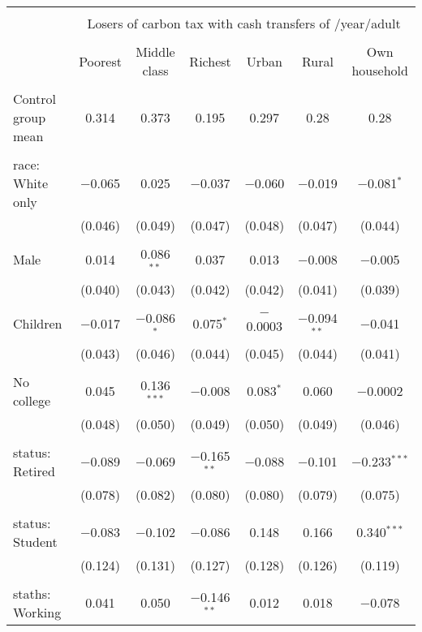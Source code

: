
\begin{tabular}{@{\extracolsep{5pt}}lcccccc} 
\\[-1.8ex]\hline 
\hline \\[-1.8ex] 
 & \multicolumn{6}{c}{Losers of carbon tax with cash transfers of \textdollar 600/year/adult} \\ 
\cline{2-7} 
\\[-1.8ex] & Poorest & Middle class & Richest & Urban & Rural & Own household \\ 
\hline \\[-1.8ex] 
 Control group mean & 0.314 & 0.373 & 0.195 & 0.297 & 0.28 & 0.28  \\ \hline \\[-1.8ex] race: White only & $-$0.065 & 0.025 & $-$0.037 & $-$0.060 & $-$0.019 & $-$0.081$^{*}$ \\ 
  & (0.046) & (0.049) & (0.047) & (0.048) & (0.047) & (0.044) \\ 
  & & & & & & \\ 
 Male & 0.014 & 0.086$^{**}$ & 0.037 & 0.013 & $-$0.008 & $-$0.005 \\ 
  & (0.040) & (0.043) & (0.042) & (0.042) & (0.041) & (0.039) \\ 
  & & & & & & \\ 
 Children & $-$0.017 & $-$0.086$^{*}$ & 0.075$^{*}$ & $-$0.0003 & $-$0.094$^{**}$ & $-$0.041 \\ 
  & (0.043) & (0.046) & (0.044) & (0.045) & (0.044) & (0.041) \\ 
  & & & & & & \\ 
 No college & 0.045 & 0.136$^{***}$ & $-$0.008 & 0.083$^{*}$ & 0.060 & $-$0.0002 \\ 
  & (0.048) & (0.050) & (0.049) & (0.050) & (0.049) & (0.046) \\ 
  & & & & & & \\ 
 status: Retired & $-$0.089 & $-$0.069 & $-$0.165$^{**}$ & $-$0.088 & $-$0.101 & $-$0.233$^{***}$ \\ 
  & (0.078) & (0.082) & (0.080) & (0.080) & (0.079) & (0.075) \\ 
  & & & & & & \\ 
 status: Student & $-$0.083 & $-$0.102 & $-$0.086 & 0.148 & 0.166 & 0.340$^{***}$ \\ 
  & (0.124) & (0.131) & (0.127) & (0.128) & (0.126) & (0.119) \\ 
  & & & & & & \\ 
 staths: Working & 0.041 & 0.050 & $-$0.146$^{**}$ & 0.012 & 0.018 & $-$0.078 \\ 

\end{tabular}

